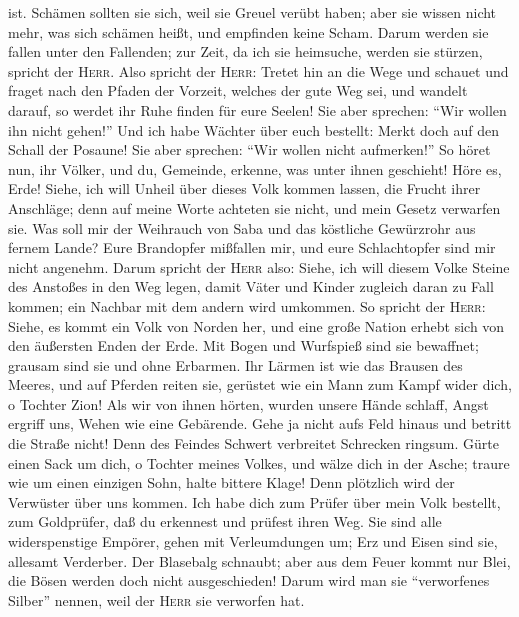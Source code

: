 ist.  Schämen sollten sie sich, weil sie Greuel verübt
haben; aber sie wissen nicht mehr, was sich schämen heißt, und empfinden
keine Scham. Darum werden sie fallen unter den Fallenden; zur Zeit, da
ich sie heimsuche, werden sie stürzen, spricht der \textsc{Herr}.
 Also spricht der \textsc{Herr}: Tretet hin an die Wege
und schauet und fraget nach den Pfaden der Vorzeit, welches der gute Weg
sei, und wandelt darauf, so werdet ihr Ruhe finden für eure Seelen! Sie
aber sprechen: ``Wir wollen ihn nicht gehen!''  Und ich
habe Wächter über euch bestellt: Merkt doch auf den Schall der Posaune!
Sie aber sprechen: ``Wir wollen nicht aufmerken!''  So
höret nun, ihr Völker, und du, Gemeinde, erkenne, was unter ihnen
geschieht! Höre es, Erde!  Siehe, ich will Unheil über
dieses Volk kommen lassen, die Frucht ihrer Anschläge; denn auf meine
Worte achteten sie nicht, und mein Gesetz verwarfen sie. 
Was soll mir der Weihrauch von Saba und das köstliche Gewürzrohr aus
fernem Lande? Eure Brandopfer mißfallen mir, und eure Schlachtopfer sind
mir nicht angenehm.  Darum spricht der \textsc{Herr}
also: Siehe, ich will diesem Volke Steine des Anstoßes in den Weg legen,
damit Väter und Kinder zugleich daran zu Fall kommen; ein Nachbar mit
dem andern wird umkommen.  So spricht der \textsc{Herr}:
Siehe, es kommt ein Volk von Norden her, und eine große Nation erhebt
sich von den äußersten Enden der Erde.  Mit Bogen und
Wurfspieß sind sie bewaffnet; grausam sind sie und ohne Erbarmen. Ihr
Lärmen ist wie das Brausen des Meeres, und auf Pferden reiten sie,
gerüstet wie ein Mann zum Kampf wider dich, o Tochter Zion!
 Als wir von ihnen hörten, wurden unsere Hände schlaff,
Angst ergriff uns, Wehen wie eine Gebärende.  Gehe ja
nicht aufs Feld hinaus und betritt die Straße nicht! Denn des Feindes
Schwert verbreitet Schrecken ringsum.  Gürte einen Sack
um dich, o Tochter meines Volkes, und wälze dich in der Asche; traure
wie um einen einzigen Sohn, halte bittere Klage! Denn plötzlich wird der
Verwüster über uns kommen.  Ich habe dich zum Prüfer über
mein Volk bestellt, zum Goldprüfer, daß du erkennest und prüfest ihren
Weg.  Sie sind alle widerspenstige Empörer, gehen mit
Verleumdungen um; Erz und Eisen sind sie, allesamt Verderber.
 Der Blasebalg schnaubt; aber aus dem Feuer kommt nur
Blei, die Bösen werden doch nicht ausgeschieden!  Darum
wird man sie ``verworfenes Silber'' nennen, weil der \textsc{Herr} sie
verworfen hat.


